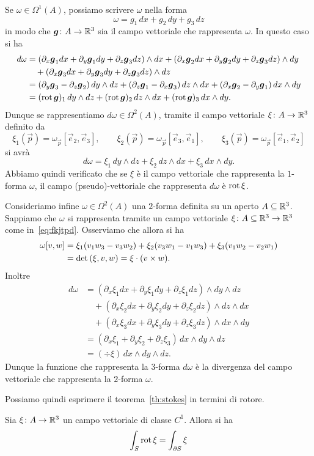 Se $\omega\in \Omega^1(A)$, possiamo scrivere $\omega$ nella forma 
\[
 \omega = g_1\, dx + g_2\, dy + g_3\, dz
\]
in modo che $\boldsymbol g \colon A\to{\mathbb R}^3$ sia il campo vettoriale che rappresenta $\omega$.
In questo caso si ha 
\begin{align*}
    d\omega &= (\partial_x \boldsymbol g_1 dx + \partial_y \boldsymbol g_1 dy + \partial_z \boldsymbol g_3 dz)\wedge dx 
    + (\partial_x \boldsymbol g_2 dx + \partial_y \boldsymbol g_2 dy + \partial_z \boldsymbol g_3 dz)\wedge dy \\
    & \quad + (\partial_x \boldsymbol g_3 dx + \partial_y \boldsymbol g_3 dy + \partial_z \boldsymbol g_3 dz)\wedge dz \\    
    &= (\partial_y \boldsymbol g_3 - \partial_z \boldsymbol g_2)\, dy \wedge dz
       + (\partial_z \boldsymbol g_1 - \partial_x \boldsymbol g_3)\, dz\wedge dx 
       + (\partial_x \boldsymbol g_2 - \partial_y \boldsymbol g_1)\, dx \wedge dy\\
    &= (\operatorname{rot} \boldsymbol g)_1 \, dy \wedge dz
       + (\operatorname{rot} \boldsymbol g)_2\, dz\wedge dx 
       + (\operatorname{rot} \boldsymbol g)_3\, dx \wedge dy.
\end{align*}
Dunque se rappresentiamo $d\omega\in \Omega^2(A)$, tramite 
il campo vettoriale $\xi\colon A\to {\mathbb R}^3$
definito da 
\[
\xi_1(\vec p) = \omega_{\vec p}[\vec e_2,\vec e_3], \qquad
\xi_2(\vec p) = \omega_{\vec p}[\vec e_3,\vec e_1], \qquad
\xi_3(\vec p) = \omega_{\vec p}[\vec e_1,\vec e_2]
\]
si avrà
\begin{equation}\label{eq:fkjtpd}
  d \omega = \xi_1\, dy \wedge dz + \xi_2\, dz\wedge dx + \xi_3\, dx\wedge dy.
\end{equation}
Abbiamo quindi verificato che se $\xi$ è il campo vettoriale che rappresenta 
la $1$-forma $\omega$, il campo (pseudo)-vettoriale che rappresenta $d\omega$
è $\operatorname{rot} \xi$.

Consideriamo infine $\omega \in \Omega^2(A)$ una $2$-forma 
definita su un aperto $A\subseteq{\mathbb R}^3$.
Sappiamo che $\omega$ si rappresenta tramite un campo
vettoriale $\xi \colon A \subseteq {\mathbb R}^3 \to {\mathbb R}^3$  
come in~\eqref{eq:fkjtpd}.
Osserviamo che allora si ha 
\begin{align*}
  \omega[v,w] 
  &= \xi_1 (v_1 w_3 - v_3 w_2) + \xi_2 (v_3 w_1 - v_1 w_3)
   + \xi_3 (v_1 w_2 - v_2 w_1) \\
   &= \det {\left( \xi, v, w \right)} = \xi \cdot (v\times w).
\end{align*}
Inoltre
\begin{align*}
 d\omega &= (\partial_x \xi_1 dx + \partial_y \xi_1 dy + \partial_z \xi_1 dz) \wedge dy \wedge dz \\
    &\quad + (\partial_x \xi_2 dx + \partial_y \xi_2 dy + \partial_z \xi_2 dz) \wedge dz \wedge dx \\
    &\quad + (\partial_x \xi_3 dx + \partial_y \xi_3 dy + \partial_z \xi_3 dz) \wedge dx \wedge dy \\
    &= (\partial_x \xi_1 + \partial_y \xi_2 + \partial_z \xi_3)\, dx \wedge dy \wedge dz\\
    &= (\div \xi)\, dx \wedge dy \wedge dz.
\end{align*}
Dunque la funzione che rappresenta la $3$-forma $d\omega$ 
è la divergenza del campo vettoriale che rappresenta la $2$-forma $\omega$.

Possiamo quindi esprimere il teorema~\ref{th:stokes} in termini di rotore.
\begin{theorem}
Sia $\xi\colon A\to {\mathbb R}^3$ un campo vettoriale di classe $C^1$.
Allora si ha 
\[
 \int_S \operatorname{rot} \xi = \int_{\partial S} \xi
\]

\end{theorem}